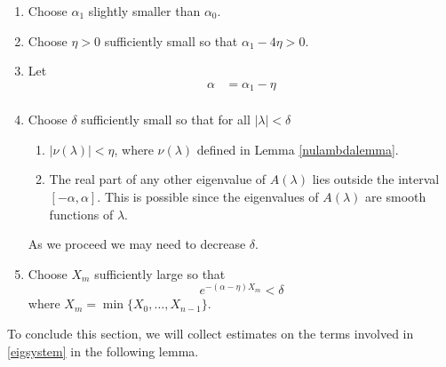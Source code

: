 \documentclass[thesis.tex]{subfiles}
\begin{document}
\begin{enumerate}
	\item Choose $\alpha_1$ slightly smaller than $\alpha_0$.

	\item Choose $\eta > 0$ sufficiently small so that $\alpha_1 - 4 \eta > 0$.

	\item Let
	\begin{align*}
	\alpha &= \alpha_1 - \eta \\
	\end{align*}

	\item Choose $\delta$ sufficiently small so that for all $|\lambda| < \delta$
	\begin{enumerate}
		\item $|\nu(\lambda)| < \eta$, where $\nu(\lambda)$ defined in Lemma \ref{nulambdalemma}.

		\item The real part of any other eigenvalue of $A(\lambda)$ lies outside the interval $[-\alpha, \alpha]$. This is possible since the eigenvalues of $A(\lambda)$ are smooth functions of $\lambda$.
	\end{enumerate}
	As we proceed we may need to decrease $\delta$. 

	\item Choose $X_m$ sufficiently large so that
	\begin{equation}
	e^{-(\alpha - \eta) X_m} < \delta
	\end{equation}
	where $X_m = \min\{X_0, \dots, X_{n-1}\}$.
\end{enumerate}

To conclude this section, we will collect estimates on the terms involved in \eqref{eigsystem} in the following lemma.
\end{document}
